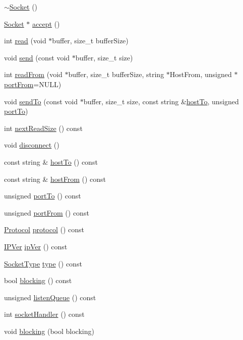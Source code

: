 \begin{DoxyCompactItemize}
\item 
\hyperlink{classSocket_aeac4eb6379a543d38ed88977d3b6630a}{$\sim$\+Socket} ()
\item 
\hyperlink{classSocket}{Socket} $\ast$ \hyperlink{classSocket_ad5c1661c21238b91789869512a5436bd}{accept} ()
\item 
int \hyperlink{classSocket_a9321c801007be471daf2b6f3201776e4}{read} (void $\ast$buffer, size\+\_\+t buffer\+Size)
\item 
void \hyperlink{classSocket_a9d303166383fb1b85827dabd5d85dc4d}{send} (const void $\ast$buffer, size\+\_\+t size)
\item 
int \hyperlink{classSocket_a56afc7070c2f55da561c8f8aa81050b2}{read\+From} (void $\ast$buffer, size\+\_\+t buffer\+Size, string $\ast$Host\+From, unsigned $\ast$\hyperlink{classSocket_acea4e417eb685f5f9c8e743b918cd84e}{port\+From}=N\+U\+L\+L)
\item 
void \hyperlink{classSocket_ad59c21fcd55db58994851f98309ffdec}{send\+To} (const void $\ast$buffer, size\+\_\+t size, const string \&\hyperlink{classSocket_a29c3b32215592f8154975c87f63dcbfb}{host\+To}, unsigned \hyperlink{classSocket_aea64c4f67d903198cff5a6285a0f9a7e}{port\+To})
\item 
int \hyperlink{classSocket_ab64c5b08163dbb79810c48749e61409f}{next\+Read\+Size} () const 
\item 
void \hyperlink{classSocket_a0aed22a4e59d0492ee5ed6d5c89ef762}{disconnect} ()
\item 
const string \& \hyperlink{classSocket_a29c3b32215592f8154975c87f63dcbfb}{host\+To} () const 
\item 
const string \& \hyperlink{classSocket_a12045edc739ce34fbe98e86909951ce1}{host\+From} () const 
\item 
unsigned \hyperlink{classSocket_aea64c4f67d903198cff5a6285a0f9a7e}{port\+To} () const 
\item 
unsigned \hyperlink{classSocket_acea4e417eb685f5f9c8e743b918cd84e}{port\+From} () const 
\item 
\hyperlink{core_8h_aac39b55be6469395f55ff0292ad8184c}{Protocol} \hyperlink{classSocket_a4e03da6ff0420bf0a2e123142ce11093}{protocol} () const 
\item 
\hyperlink{core_8h_a3afbe2755e4a6912bfce39e7069c2d3d}{I\+P\+Ver} \hyperlink{classSocket_a00640e1194207685a9169d130dd31500}{ip\+Ver} () const 
\item 
\hyperlink{core_8h_aa78c7398fa81f7f62aa233159d4d8d97}{Socket\+Type} \hyperlink{classSocket_a4dadcac478a053c6fe6111dae36eb2b3}{type} () const 
\item 
bool \hyperlink{classSocket_ae3108b16d019c1c06cc94b6c5070a8c5}{blocking} () const 
\item 
unsigned \hyperlink{classSocket_af365c5326acff9571194897b55ae70e5}{listen\+Queue} () const 
\item 
int \hyperlink{classSocket_a4fc638fcdd0ea5cd9cb1d15d68899b34}{socket\+Handler} () const 
\item 
void \hyperlink{classSocket_a8bfe50531649139736b1ea42dffcda95}{blocking} (bool blocking)
\end{DoxyCompactItemize}


